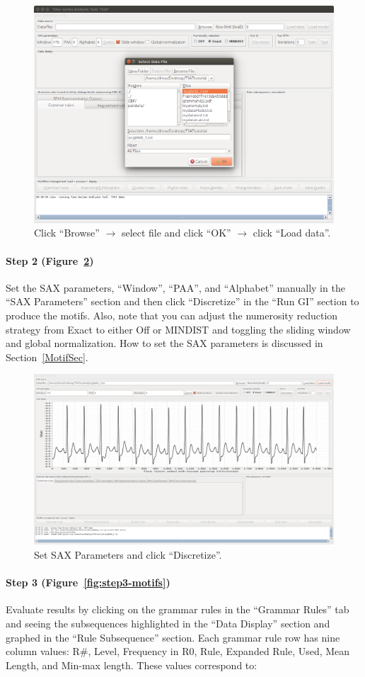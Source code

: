 \documentclass[letterpaper, 12pt]{article}
\begin{document}
\begin{figure}[H]
	\centering
	\includegraphics[width=0.7\linewidth]{pictures/motifguide/step1-browse}
	\caption{Click ``Browse'' $\rightarrow$ select file and click ``OK'' $\rightarrow$ click ``Load data''.}
	\label{fig:step1-browse}
\end{figure}


\paragraph{Step 2 (Figure~\ref{fig:step2-loaded})} Set the SAX parameters, ``Window'', ``PAA'', and ``Alphabet'' manually in the ``SAX Parameters'' section and then click ``Discretize'' in the ``Run GI'' section to produce the motifs.  Also, note that you can adjust the numerosity reduction strategy from Exact to either Off or MINDIST and toggling the sliding window and global normalization. How to set the SAX parameters is discussed in Section~\ref{MotifSec}.

\begin{figure}[H]
	\centering
	\includegraphics[width=0.7\linewidth]{pictures/motifguide/Step2-loaded}
	\caption{Set SAX Parameters and click ``Discretize''.}
	\label{fig:step2-loaded}
\end{figure}


\paragraph{Step 3 (Figure~\ref{fig:step3-motifs})} Evaluate results by clicking on the grammar rules in the ``Grammar Rules'' tab and seeing the subsequences highlighted in the ``Data Display'' section and graphed in the ``Rule Subsequence'' section.  Each grammar rule row has nine column values: R\#, Level, Frequency in R0, Rule, Expanded Rule, Used, Mean Length, and Min-max length.  These values correspond to:
\end{document}
